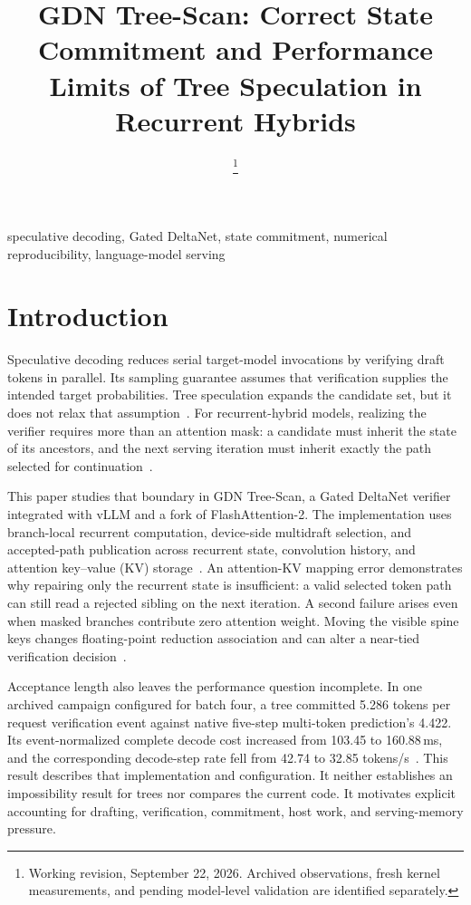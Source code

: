 \documentclass[conference]{IEEEtran}
\newcommand{\sys}{GDN Tree-Scan}
\begin{document}
\title{GDN Tree-Scan: Correct State Commitment and Performance Limits of Tree Speculation in Recurrent Hybrids}
\author{
\thanks{Working revision, September 22, 2026. Archived observations, fresh kernel measurements, and pending model-level validation are identified separately.}}
\maketitle

\begin{IEEEkeywords}
speculative decoding, Gated DeltaNet, state commitment, numerical reproducibility, language-model serving
\end{IEEEkeywords}

\section{Introduction}
Speculative decoding reduces serial target-model invocations by verifying draft tokens in parallel. Its sampling guarantee assumes that verification supplies the intended target probabilities. Tree speculation expands the candidate set, but it does not relax that assumption~\cite{leviathan2023fast,chen2023sampling,miao2023specinfer}. For recurrent-hybrid models, realizing the verifier requires more than an attention mask: a candidate must inherit the state of its ancestors, and the next serving iteration must inherit exactly the path selected for continuation~\cite{yang2024gated,wu2025stree}.

This paper studies that boundary in \sys{}, a Gated DeltaNet verifier integrated with vLLM and a fork of FlashAttention-2. The implementation uses branch-local recurrent computation, device-side multidraft selection, and accepted-path publication across recurrent state, convolution history, and attention key--value (KV) storage~\cite{lumo2026receipts,lumo2026stateless}. An attention-KV mapping error demonstrates why repairing only the recurrent state is insufficient: a valid selected token path can still read a rejected sibling on the next iteration. A second failure arises even when masked branches contribute zero attention weight. Moving the visible spine keys changes floating-point reduction association and can alter a near-tied verification decision~\cite{lumo2026spine}.

Acceptance length also leaves the performance question incomplete. In one archived campaign configured for batch four, a tree committed 5.286 tokens per request verification event against native five-step multi-token prediction's 4.422. Its event-normalized complete decode cost increased from 103.45 to 160.88\,ms, and the corresponding decode-step rate fell from 42.74 to 32.85 tokens/s~\cite{lumo2026cost,lumo2026archive}. This result describes that implementation and configuration. It neither establishes an impossibility result for trees nor compares the current code. It motivates explicit accounting for drafting, verification, commitment, host work, and serving-memory pressure.
\end{document}
